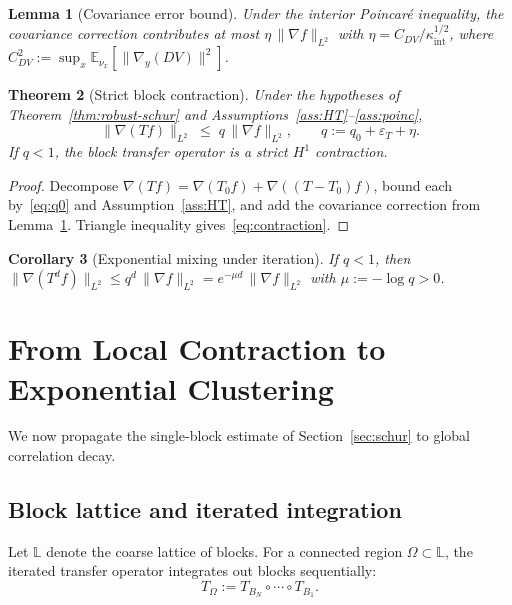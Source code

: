 \documentclass[11pt]{article}
\newtheorem{theorem}{Theorem}[section]
\newtheorem{lemma}[theorem]{Lemma}
\newtheorem{corollary}[theorem]{Corollary}
\theoremstyle{definition}
\newcommand{\E}{\mathbb{E}}
\newcommand{\1}{\mathbf{1}}
\newcommand{\norm}[1]{\lVert #1\rVert}
\begin{document}
\begin{lemma}[Covariance error bound]\label{lem:cov-bound}
Under the interior Poincar\'e inequality, the covariance correction contributes at most
$\eta\,\norm{\nabla f}_{L^2}$ with $\eta=C_{DV}/\kappa_{\mathrm{int}}^{1/2}$, where
$C_{DV}^2:=\sup_x\E_{\nu_x}[\norm{\nabla_y(DV)}^2]$.
\end{lemma}

\begin{theorem}[Strict block contraction]\label{thm:contraction}
Under the hypotheses of Theorem~\ref{thm:robust-schur} and
Assumptions~\ref{ass:HT}--\ref{ass:poinc},
\begin{equation}\label{eq:contraction}
\norm{\nabla(Tf)}_{L^2} \;\le\; q\,\norm{\nabla f}_{L^2},\qquad
q := q_0 + \varepsilon_T + \eta.
\end{equation}
If $q<1$, the block transfer operator is a strict $H^1$ contraction.
\end{theorem}

\begin{proof}
Decompose $\nabla(Tf)=\nabla(T_0 f)+\nabla((T-T_0)f)$, bound each by~\eqref{eq:q0}
and Assumption~\ref{ass:HT}, and add the covariance correction from
Lemma~\ref{lem:cov-bound}.  Triangle inequality gives~\eqref{eq:contraction}.
\end{proof}

\begin{corollary}[Exponential mixing under iteration]\label{cor:mixing}
If $q<1$, then $\norm{\nabla(T^d f)}_{L^2}\le q^d\,\norm{\nabla f}_{L^2}
=e^{-\mu d}\,\norm{\nabla f}_{L^2}$ with $\mu:=-\log q>0$.
\end{corollary}

\section{From Local Contraction to Exponential Clustering}\label{sec:clustering}

We now propagate the single-block estimate of Section~\ref{sec:schur} to global
correlation decay.

\subsection{Block lattice and iterated integration}

Let $\mathbb{L}$ denote the coarse lattice of blocks.  For a connected region
$\Omega\subset\mathbb{L}$, the iterated transfer operator integrates out blocks sequentially:
\[
T_\Omega := T_{B_N}\circ\cdots\circ T_{B_1}.
\]
\end{document}
